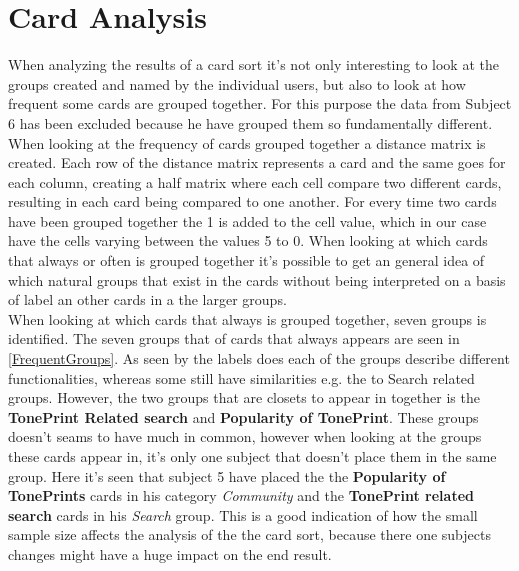 \section{Card Analysis}
\label{CardAnalysis}
When analyzing the results of a card sort it's not only interesting to look at the groups created and named by the individual users, but also to look at how frequent some cards are grouped together. For this purpose the data from Subject 6 has been excluded because he have grouped them so fundamentally different. When looking at the frequency of cards grouped together a distance matrix is created. Each row of the distance matrix represents a card and the same goes for each column, creating a half matrix where each cell compare two different cards, resulting in each card being compared to one another. For every time two cards have been grouped together the 1 is added to the cell value, which in our case have the cells varying between the values 5 to 0. When looking at which cards that always or often is grouped together it's possible to get an general idea of which natural groups that exist in the cards without being interpreted on a basis of label an other cards in a the larger groups.\\
When looking at which cards that always is grouped together, seven groups is identified. The seven groups that of cards that always appears are seen in \autoref{FrequentGroups}. As seen by the labels does each of the groups describe different functionalities, whereas some still have similarities e.g. the to Search related groups. However, the two groups that are closets to appear in together is the \textbf{TonePrint Related search} and \textbf{Popularity of TonePrint}. These groups doesn't seams to have much in common, however when looking at the groups these cards appear in, it's only one subject that doesn't place them in the same group. Here it's seen that subject 5 have placed the the \textbf{Popularity of TonePrints} cards in his category \textit{Community} and the \textbf{TonePrint related search} cards in his \textit{Search} group. This is a good indication of how the small sample size affects the analysis of the the card sort, because there one subjects changes might have a huge impact on the end result. 


